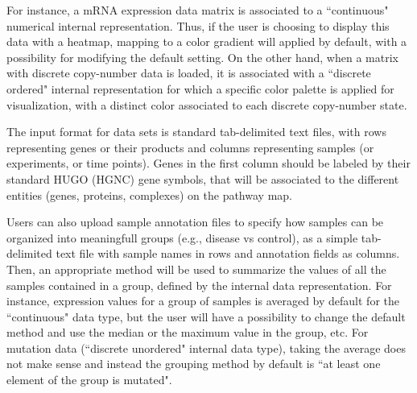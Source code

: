 \documentclass[a4,center,fleqn]{NAR}
\begin{document}
For instance, a mRNA expression data matrix is associated to a
``continuous" numerical internal representation. Thus, if the user is choosing to display
this data with a heatmap, mapping to a color gradient will applied by default, with a possibility
for modifying the default setting. On the other hand, when a
matrix with discrete copy-number data is loaded, it is associated with a
``discrete ordered" internal representation for which
a specific color palette is applied for visualization,
with a distinct color associated to each discrete copy-number state.

The input format for data sets is standard tab-delimited text files, with rows
representing genes or their products and columns representing samples (or experiments, or time
points). Genes in the first column should be labeled by their standard HUGO (HGNC)
gene symbols, that will be associated to the different entities (genes,
proteins, complexes) on the pathway map.

Users can also upload sample annotation files to specify how samples can be organized into meaningfull groups
(e.g., disease vs control), as a simple tab-delimited text file with sample names in
rows and annotation fields as columns. Then, an appropriate method will be used
to summarize the values of all the samples contained in a group, defined by the
internal data representation. For instance, expression values for a group of samples
is averaged by default for the ``continuous" data type, but the user will have
a possibility to change the default method and use the median or
the maximum value in the group, etc. For mutation data (``discrete unordered" internal data type),
taking the average does not make sense and instead the grouping method by default is
``at least one element of the group is mutated".

\begin{table}
{
}
\end{table}
\end{document}
